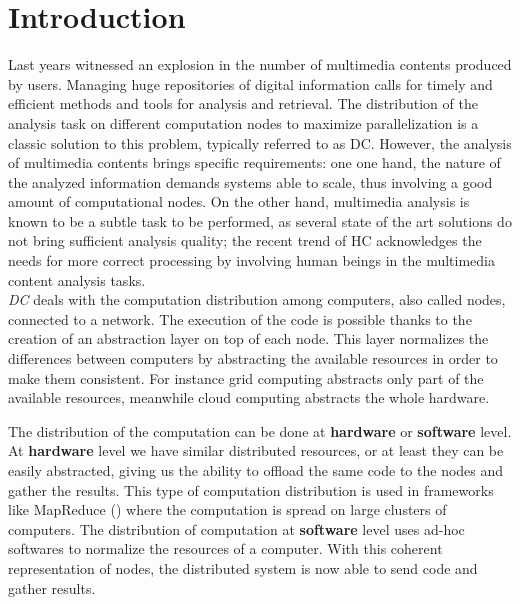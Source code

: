\cleardoublepage
\chapter{Introduction}
\label{intro}


Last years witnessed an explosion in the number of multimedia contents produced
by users. Managing huge repositories of digital information calls for timely and
efficient methods and tools for analysis and retrieval. The distribution of the
analysis task on different computation nodes to maximize parallelization is a
classic solution to this problem, typically referred to as \ac{DC}. However,
the analysis of multimedia contents brings specific requirements: one one hand,
the nature of the analyzed information demands systems able to scale, thus
involving a good amount of computational nodes. On the other hand, multimedia
analysis is known to be a subtle task to be performed, as several state of the
art solutions do not bring sufficient analysis quality; the recent trend of \ac{HC}
acknowledges the needs for more correct processing by involving human beings in
the multimedia content analysis tasks.\\


\emph{\acl{DC}} deals with the computation distribution among computers, also
called nodes, connected to a network. The execution of the code is possible thanks
to the creation of an abstraction layer on top of each node. This layer normalizes
the differences between computers by abstracting the available resources in order
to make them consistent. For instance grid computing abstracts only part of the
available resources, meanwhile cloud computing abstracts the whole hardware.

The distribution of the computation can be done at \textbf{hardware} or
\textbf{software} level.
At \textbf{hardware} level we have similar distributed resources, or at least
they can be easily abstracted, giving us the ability to offload the same code to the
nodes and gather the results. This type of computation distribution is used in
frameworks like MapReduce (\cite{dean2008mapreduce}) where the
computation is spread on large clusters of computers.
The distribution of computation at \textbf{software} level uses ad-hoc softwares
to normalize the resources of a computer. With this coherent representation of
nodes, the distributed system is now able to send code and gather results.

